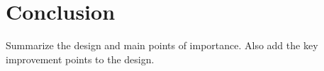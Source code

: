\chapter{Conclusion} \label{chap:conclusion}

Summarize the design and main points of importance. Also add the key improvement points to the design.